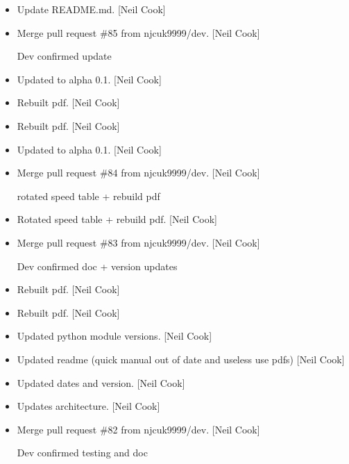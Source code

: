 \documentclass[a4paper,10pt,english]{report}
\begin{document}
\label{\detokenize{misc/changelog:id520}}\begin{itemize}
\item {} 
Update README.md. {[}Neil Cook{]}

\item {} 
Merge pull request \#85 from njcuk9999/dev. {[}Neil Cook{]}

Dev \sphinxhyphen{} confirmed update

\item {} 
Updated to alpha 0.1. {[}Neil Cook{]}

\item {} 
Rebuilt pdf. {[}Neil Cook{]}

\item {} 
Rebuilt pdf. {[}Neil Cook{]}

\item {} 
Updated to alpha 0.1. {[}Neil Cook{]}

\item {} 
Merge pull request \#84 from njcuk9999/dev. {[}Neil Cook{]}

rotated speed table + rebuild pdf

\item {} 
Rotated speed table + rebuild pdf. {[}Neil Cook{]}

\item {} 
Merge pull request \#83 from njcuk9999/dev. {[}Neil Cook{]}

Dev \sphinxhyphen{} confirmed doc + version updates

\item {} 
Rebuilt pdf. {[}Neil Cook{]}

\item {} 
Rebuilt pdf. {[}Neil Cook{]}

\item {} 
Updated python module versions. {[}Neil Cook{]}

\item {} 
Updated readme (quick manual out of date and useless \sphinxhyphen{} use pdfs) {[}Neil
Cook{]}

\item {} 
Updated dates and version. {[}Neil Cook{]}

\item {} 
Updates architecture. {[}Neil Cook{]}

\item {} 
Merge pull request \#82 from njcuk9999/dev. {[}Neil Cook{]}

Dev \sphinxhyphen{} confirmed testing and doc


\end{itemize}
\end{document}
